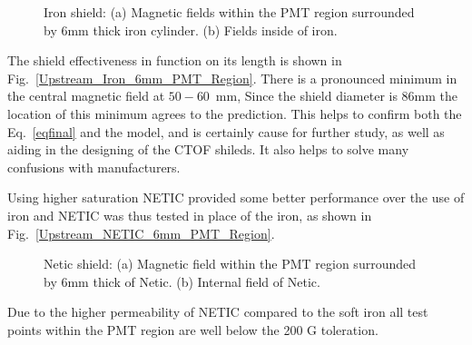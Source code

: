 \documentclass[12pt]{article}
\begin{document}
\begin{figure}[ht]
\centering
{}
\qquad
{}
\caption{\small{Iron shield: 
(a) Magnetic fields within the 
PMT region surrounded by 6mm thick iron cylinder. 
(b) Fields inside  of iron.}
\label{Upstream_SingleIron_6mm}}
\end{figure}
%
The  shield  effectiveness  in function on its length is shown in
Fig.~\ref{Upstream_Iron_6mm_PMT_Region}.
 There is a pronounced minimum in the central  magnetic field 
at $50-60$~mm, 
Since the shield diameter is  86mm  the  location of this minimum   agrees to the prediction.
This helps to confirm both  the Eq.~\ref{eqfinal} and the model, 
and is certainly cause for further study, 
as well as aiding in the designing of the CTOF shileds.
It also helps to solve many confusions with manufacturers.

Using higher saturation NETIC provided some  better  performance over the use of iron
and NETIC was thus tested in place
of the iron, as shown in Fig.~\ref{Upstream_NETIC_6mm_PMT_Region}.

\begin{figure}[ht]
\centering
{}
\qquad
{}
\caption{\small{Netic  shield: (a) Magnetic field within the  PMT region
 surrounded by 6mm thick of Netic. (b) Internal  field of Netic.}}
\label{Upstream_SingleNETIC_6mm}
\end{figure}
%
Due to the higher permeability of NETIC compared to the soft iron all test points 
within the PMT region are well below the 200 G toleration.
\end{document}
